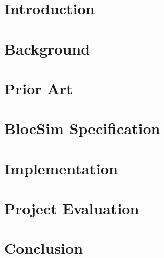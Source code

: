 
\chapter{Introduction}



\chapter{Background}



\chapter{Prior Art}



\chapter{BlocSim Specification}



\chapter{Implementation}



\chapter{Project Evaluation}



\chapter{Conclusion}




